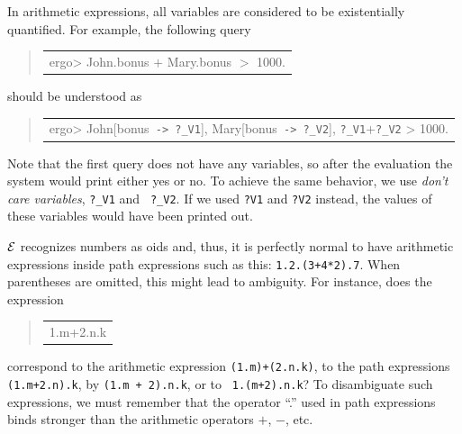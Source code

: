 \documentclass[11pt]{article}
\newcommand{\ERGO}{\mbox{\ensuremath{\cal{E}}\smaller{{\sc{RGO}}}}\xspace}
\newcommand{\FLSYSTEM}{\ERGO}
\newcommand{\prompt}{ergo> }
\newenvironment{qrules}{\begin{quote}\tt\begin{tabular}[t]{l}}%
{\end{tabular}\end{quote}}
\newcommand{\mvd}{{\mbox{\tt \,->\,}}}  %
\begin{document}
In arithmetic expressions, all variables are considered to be
existentially quantified. For example, the following query
\begin{qrules}
\prompt John.bonus $+$ Mary.bonus $>$ 1000.
\end{qrules}
should be understood as
\begin{qrules}
\prompt John[bonus{\mvd}{\tt ?\_V1}], Mary[bonus{\mvd}{\tt ?\_V2}], {\tt ?\_V1}+{\tt ?\_V2} > 1000.
\end{qrules}
Note that the first query does not have any variables, so after the
evaluation the system would print either yes or no. To achieve the same
behavior, we use \emph{don't care variables}, {\tt ?\_V1} and {\tt
  ?\_V2}. If we used {\tt ?V1} and {\tt ?V2} instead, the values of these
variables would have been printed out.

\FLSYSTEM recognizes numbers as oids and, thus, it is perfectly normal to have
arithmetic expressions inside path expressions such as this:
{\tt 1.2.(3+4*2).7}. When parentheses are omitted, this might lead to
ambiguity.
For instance, does the expression
\begin{qrules}
1.m+2.n.k
\end{qrules}
correspond to
the arithmetic expression {\tt (1.m)+(2.n.k)}, to
the path expressions {\tt (1.m+2.n).k}, by {\tt (1.m + 2).n.k}, or to {\tt
  1.(m+2).n.k}? To disambiguate such expressions, we must remember that the
operator ``.'' used in path expressions binds stronger than the
arithmetic operators $+$, $-$, etc.
\end{document}
